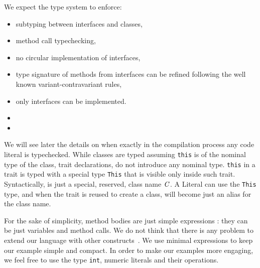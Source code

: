 We expect the type system to enforce: 
\begin{itemize}
\item subtyping between interfaces and classes,
\item method call typechecking,
\item no circular implementation of interfaces,
\item type signature of methods from interfaces can be refined following the well known variant-contravariant rules,
\item only interfaces can be implemented.
\item {}
\item {}
\end{itemize}
We will see later the details on when exactly in the compilation process any code literal is typechecked.
While classes are typed assuming \lstinline{this} is of the nominal type of the
class, trait declarations, do not introduce any nominal type.  \lstinline{this}
in a trait is typed with a special type \lstinline{This} that is visible only
inside such trait. Syntactically, \Q@This@ is just a special, reserved, class name $\mathit{C}$.
A Literal can use the \lstinline{This} type,
and when the trait is reused to create a class, \Q@This@ will become just
an alias for the class name.

For the sake of simplicity, method bodies are just simple expressions
\me: they can be just variables and method calls.
We do not think that there is any problem to extend our language with
other constructs~. We use minimal expressions to keep our example
simple and compact. In order to make our examples more engaging, we
feel free to use the type \lstinline{int}, numeric literals and their operations.

